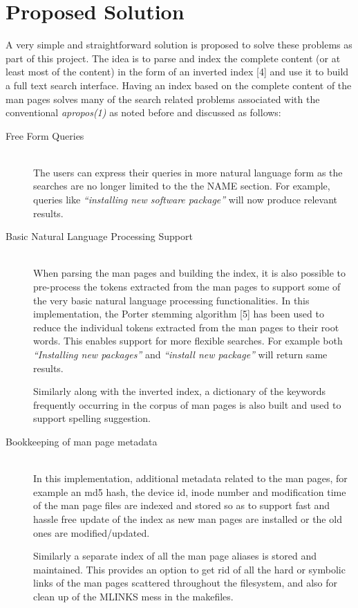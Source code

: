 \documentclass[titlepage, a4paper, 12pt]{article}
\begin{document}
\section{Proposed Solution}
A very simple and straightforward solution is proposed to solve these problems as
part of this project.
The idea is to parse and index
the complete content (or at least most of the content) in the form of an
inverted index [4] and use it to build a full text search
interface. Having an index based on the complete content of the man pages solves
many of the search
related problems associated with the conventional \textit{apropos(1)} as noted
before and discussed as follows:
\begin{description}
\item[Free Form Queries] \hfill \\
The users can express their queries in more natural language form as the searches
are no longer limited to the the NAME section.
For example, queries like \textit{``installing new software package''} will
now produce relevant results.
\end{description}
\begin{description}
\item[Basic Natural Language Processing Support] \hfill \\
When parsing the man pages and building the index, it is also possible to
pre-process the tokens extracted from the man pages to support some of the very
basic natural language processing functionalities. In this implementation, the
Porter stemming algorithm [5] has been used to
reduce the individual tokens extracted from the man pages to their root words.
This enables support for more flexible searches. For example both
\textit{``Installing new packages''} and \textit{``install new package''} will
return same results.

Similarly along with the inverted index, a dictionary of the keywords frequently
occurring in the corpus of man pages is also built and used to support
spelling suggestion.
\end{description}
\begin{description}
\item[Bookkeeping of man page metadata] \hfill \\
In this implementation, additional metadata related to the man pages, for example
an md5 hash, the device id, inode number and modification time
of the man page files are indexed and stored so
as to support fast and hassle free update of the index as new man pages are
installed or the old ones are modified/updated.

Similarly a separate index of all the man page aliases is stored and maintained.
This provides an option to get rid of all the hard or symbolic links of the man
pages scattered throughout the filesystem, and also for clean up of the MLINKS
mess in the makefiles.
\end{description}
\end{document}
